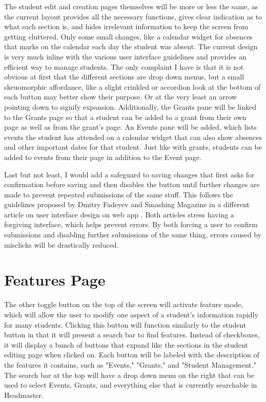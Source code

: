 \documentclass{article}
\begin{document}
The student edit and creation pages themselves will be more or less the same, as the current layout provides all the necessary functions, gives clear indication as to what each section is, and hides irrelevant information to keep the screen from getting cluttered. Only some small changes, like a calendar widget for absences that marks on the calendar each day the student was absent. The current design is very much inline with the various user interface guidelines and provides an efficient way to manage students. The only complaint I have is that it is not obvious at first that the different sections are drop down menus, but a small skeuomorphic affordance, like a slight crinkled or accordion look at the bottom of each button may better show their purpose. Or at the very least an arrow pointing down to signify expansion. Additionally, the Grants pane will be linked to the Grants page so that a student can be added to a grant from their own page as well as from the grant's page. An Events pane will be added, which lists events the student has attended on a calendar widget that can also show absences and other important dates for that student. Just like with grants, students can be added to events from their page in addition to the Event page.

Last but not least, I would add a safeguard to saving changes that first asks for confirmation before saving and then disables the button until further changes are made to prevent repeated submissions of the same stuff. This follows the guidelines proposed by Dmitry Fadeyev \cite{techniques} and Smashing Magazine in  a different article on user interface design on web app \cite{modern}. Both articles stress having a forgiving interface, which helps prevent errors. By both forcing a user to confirm submissions and disabling further submissions of the same thing, errors caused by misclicks will be drastically reduced.

\section{Features Page}

The other toggle  button on the top of the screen will activate feature mode, which will allow the user to modify one aspect of a student's information rapidly for many students. Clicking this button will function similarly to the student button in that it will present a search bar to find features. Instead of checkboxes, it will display a bunch of buttons that expand like the sections in the student editing page when clicked on. Each button will be labeled with the description of the features it contains, such as "Events," "Grants," and "Student Management." The search bar at the top will have a drop down menu on the right that can be used to select Events, Grants, and everything else that is currently searchable in Headmaster.
\end{document}
